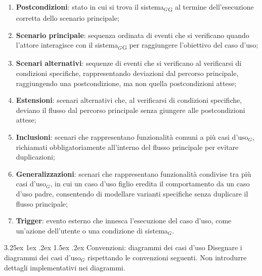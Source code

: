 \documentclass[a4paper, 10pt]{article}
\makeatletter
\renewcommand\paragraph{\@startsection{paragraph}{4}{\z@}%
  {3.25ex \@plus1ex \@minus .2ex}%
  {1.5ex \@plus .2ex}%
  {\normalfont\normalsize\bfseries}}
\makeatother
\begin{document}
\begin{enumerate}
    \item \textbf{Postcondizioni}: stato in cui si trova il sistema$_G$\textsubscript{G} al termine dell'esecuzione corretta dello scenario principale;
    \item \textbf{Scenario principale}: sequenza ordinata di eventi che si verificano quando l'attore interagisce con il sistema$_G$\textsubscript{G} per raggiungere l'obiettivo del caso d'uso;
    \item \textbf{Scenari alternativi}: sequenze di eventi che si verificano al verificarsi di condizioni specifiche, rappresentando deviazioni dal percorso principale, raggiungendo una postcondizione, ma non quella postcondizioni attese;
    \item \textbf{Estensioni}: scenari alternativi che, al verificarsi di condizioni specifiche, deviano il flusso dal percorso principale senza giungere alle postcondizioni attese;
    \item \textbf{Inclusioni}: scenari che rappresentano funzionalità comuni a più casi d'uso$_G$, richiamati obbligatoriamente all'interno del flusso principale per evitare duplicazioni;
    \item \textbf{Generalizzazioni}: scenari che rappresentano funzionalità condivise tra più casi d'uso$_G$, in cui un caso d'uso figlio eredita il comportamento da un caso d'uso padre, consentendo di modellare varianti specifiche senza duplicare il flusso principale;
    \item \textbf{Trigger}: evento esterno che innesca l'esecuzione del caso d'uso, come un'azione dell'utente o una condizione di sistema$_G$.
\end{enumerate}
\paragraph{Convenzioni: diagrammi dei casi d'uso}
Disegnare i diagrammi dei casi d'uso$_G$ rispettando le convenzioni seguenti. Non introdurre dettagli implementativi nei diagrammi.
\end{document}
